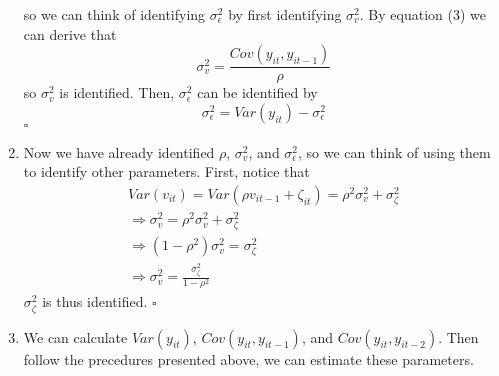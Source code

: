 \documentclass[12pt]{article}
\newcommand*{\QEDA}{\null\nobreak\hfill\ensuremath{\square}}%
\begin{document}
\begin{enumerate}
            so we can think of identifying $\sigma^2_\epsilon$ by first identifying $\sigma^2_v$. 
            By equation (3) we can derive that $$\sigma^2_v = \frac{Cov(y_{it}, y_{it-1})}{\rho}$$
            so $\sigma^2_v$ is identified. Then, $\sigma^2_\epsilon$ can be identified by 
            $$\sigma^2_\epsilon = Var(y_{it}) - \sigma^2_\epsilon$$ \QEDA
      \item Now we have already identified $\rho$, $\sigma^2_v$, and $\sigma^2_\epsilon$, so we can think of using them to identify other parameters.
      First, notice that 
      \begin{align}
      & Var(v_{it})                         = Var(\rho v_{it-1} + \zeta_{it}) = \rho^2 \sigma^2_v + \sigma^2_\zeta & \nonumber \\ 
      & \Rightarrow \sigma^2_v              = \rho^2 \sigma^2_v + \sigma^2_\zeta & \nonumber \\ 
      & \Rightarrow (1 - \rho^2) \sigma^2_v = \sigma^2_\zeta & \nonumber \\ 
      & \Rightarrow \sigma^2_v = \frac{\sigma^2_\zeta}{1 - \rho^2} & \nonumber
      \end{align}
      $\sigma^2_\zeta$ is thus identified. \QEDA
      \item We can calculate $Var(y_{it})$, $Cov(y_{it}, y_{it-1})$, and $Cov(y_{it}, y_{it-2})$. Then follow the precedures presented above, we can estimate these parameters.
\end{enumerate}
\end{document}
